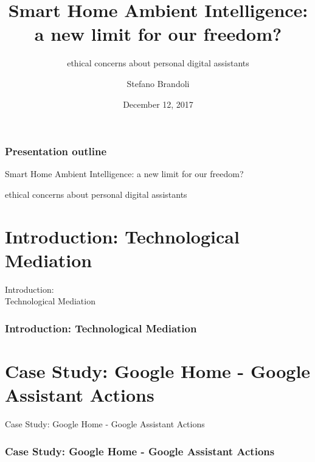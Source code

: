 \documentclass{beamer}
\title{Smart Home Ambient Intelligence: \\a new limit for our freedom?}
\subtitle{\vspace*{0.3cm}ethical concerns about personal digital assistants}
\author[Stefano Brandoli]{Stefano Brandoli}
\institute[PoliMi]{Politecnico di Milano}
\date{December 12, 2017}
\begin{document}
\begin{frame}
\maketitle
\end{frame}

\begin{frame}
\frametitle{Presentation outline}
Smart Home Ambient Intelligence: a new limit for our freedom?
\begin{center}{ethical concerns about personal digital assistants}
\end{center}

\tableofcontents
\end{frame}

\section{Introduction: Technological Mediation}

\begin{frame}
\begin{center}
	 Introduction:\\Technological Mediation
\end{center}
\end{frame}

\begin{frame}
\frametitle{Introduction: Technological Mediation}

\end{frame}

\section{Case Study: Google Home - Google Assistant Actions}

\begin{frame}
\begin{center} 
	 Case Study: Google Home - Google Assistant Actions
\end{center}
\end{frame}

\begin{frame}
\frametitle{Case Study: Google Home - Google Assistant Actions}

\end{frame}
\end{document}
